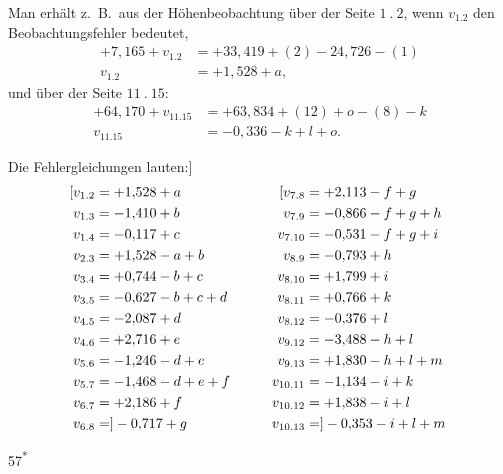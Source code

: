 Man erhält z.\ B.\ aus der Höhenbeobachtung über der Seite \(1\ .\ 2\), wenn \(v_{1.2}\)
den Beobachtungsfehler bedeutet,
\[
\begin{aligned}
+7{,}165+v_{1.2}&=+33{,}419+(2)-24{,}726-(1)\\
v_{1.2}&=+1{,}528+a,
\end{aligned}
\]
\noindent und über der Seite \(11\ .\ 15\):
\[
\begin{aligned}
+64{,}170+v_{11.15}&=+63{,}834+(12)+o-(8)-k\\
v_{11.15}&=-0{,}336-k+l+o.
\end{aligned}
\]
\par\noindent\hspace*{\parindent}Die Fehlergleichungen lauten:]
\[
\begin{aligned}
\makebox[0pt][r]{[}v_{1.2}&=+1{,}528+a &\qquad \makebox[0pt][r]{[}v_{7.8}&=+2{,}113-f+g\\
v_{1.3}&=-1{,}410+b &\qquad v_{7.9}&=-0{,}866-f+g+h\\
v_{1.4}&=-0{,}117+c &\qquad v_{7.10}&=-0{,}531-f+g+i\\
v_{2.3}&=+1{,}528-a+b &\qquad v_{8.9}&=-0{,}793+h\\
v_{3.4}&=+0{,}744-b+c &\qquad v_{8.10}&=+1{,}799+i\\
v_{3.5}&=-0{,}627-b+c+d &\qquad v_{8.11}&=+0{,}766+k\\
v_{4.5}&=-2{,}087+d &\qquad v_{8.12}&=-0{,}376+l\\
v_{4.6}&=+2{,}716+e &\qquad v_{9.12}&=-3{,}488-h+l\\
v_{5.6}&=-1{,}246-d+e &\qquad v_{9.13}&=+1{,}830-h+l+m\\
v_{5.7}&=-1{,}468-d+e+f &\qquad v_{10.11}&=-1{,}134-i+k\\
v_{6.7}&=+2{,}186+f &\qquad v_{10.12}&=+1{,}838-i+l\\
v_{6.8}&=]-0{,}717+g &\qquad v_{10.13}&=]-0{,}353-i+l+m\\
\end{aligned}
\]
\par\smallskip\noindent\hfill{\footnotesize 57\textsuperscript{*}}\hspace*{.12\linewidth}\par

